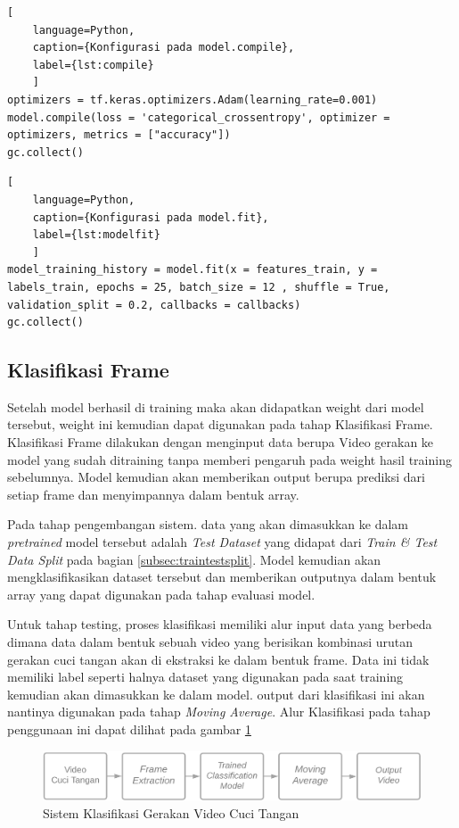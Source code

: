\begin{lstlisting}[
	language=Python,
	caption={Konfigurasi pada model.compile},
	label={lst:compile}
	]
optimizers = tf.keras.optimizers.Adam(learning_rate=0.001)
model.compile(loss = 'categorical_crossentropy', optimizer = optimizers, metrics = ["accuracy"])
gc.collect()
\end{lstlisting} 

\begin{lstlisting}[
	language=Python,
	caption={Konfigurasi pada model.fit},
	label={lst:modelfit}
	]
model_training_history = model.fit(x = features_train, y = labels_train, epochs = 25, batch_size = 12 , shuffle = True, validation_split = 0.2, callbacks = callbacks)
gc.collect()
\end{lstlisting} 

\pagebreak
\subsection{Klasifikasi Frame}
\label{subsec:klasifikasiframe}

Setelah model berhasil di training maka akan didapatkan weight dari model tersebut, weight ini kemudian dapat digunakan pada tahap Klasifikasi Frame. Klasifikasi Frame dilakukan dengan menginput data berupa Video gerakan ke model yang sudah ditraining tanpa memberi pengaruh pada weight hasil training sebelumnya. Model kemudian akan memberikan output berupa prediksi dari setiap frame dan menyimpannya dalam bentuk array.

Pada tahap pengembangan sistem. data yang akan dimasukkan ke dalam \textit{pretrained} model tersebut adalah \textit{Test Dataset} yang didapat dari \textit{Train \& Test Data Split} pada bagian \ref{subsec:traintestsplit}. Model kemudian akan mengklasifikasikan dataset tersebut dan memberikan outputnya dalam bentuk array yang dapat digunakan pada tahap evaluasi model.

Untuk tahap testing, proses klasifikasi memiliki alur input data yang berbeda dimana data dalam bentuk sebuah video yang berisikan kombinasi urutan gerakan cuci tangan akan di ekstraksi ke dalam bentuk frame. Data ini tidak memiliki label seperti halnya dataset yang digunakan pada saat training kemudian akan dimasukkan ke dalam model. output dari klasifikasi ini akan nantinya digunakan pada tahap \textit{Moving Average}. Alur Klasifikasi pada tahap penggunaan ini dapat dilihat pada gambar \ref{fig:kerjasistem}

\begin{figure}[!ht]
	\centering
	\includegraphics[width=0.9\columnwidth]{gambar/kerjasistem.png}
	\caption{Sistem Klasifikasi Gerakan Video Cuci Tangan}
	\label{fig:kerjasistem}
\end{figure}

